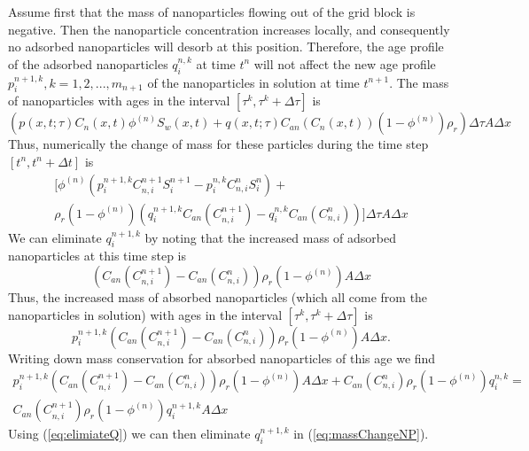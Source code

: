 \documentclass[nanomaterials,article,submit,moreauthors,pdftex]{Definitions/mdpi}
\begin{document}
Assume first that the mass of nanoparticles flowing out of the grid block is negative. Then the nanoparticle concentration increases locally, and consequently no adsorbed nanoparticles will desorb at this position. Therefore, the age profile of the adsorbed nanoparticles $q_i^{n,k}$ at time $t^n$ will not affect the new age profile  $p_i^{n+1,k},k=1,2,...,m_{n+1}$ of the nanoparticles in solution at time  $t^{n+1}$. The mass of nanoparticles with ages in the interval $\left[\tau^k, \tau^k+\Delta\tau\right]$ is
\begin{equation*}
    \left(p(x,t;\tau)C_n(x,t)\phi^{(n)}S_w(x,t) + q(x,t;\tau)C_{an}(C_n(x,t))(1-\phi^{(n)})\rho_r\right) \Delta\tau A\Delta x
\end{equation*}
Thus, numerically the change of mass for these particles during the time step $\left[t^n, t^n+\Delta t\right]$ is
\begin{multline} \label{eq:massChangeNP} %
    \bigg[\phi^{(n)}\left(p_i^{n+1,k}C_{n,i}^{n+1}S_i^{n+1}- p_{i}^{n,k}C_{n,i}^{n}S_{i}^{n}\right) +\\ \rho_r(1-\phi^{(n)}) \left(q_i^{n+1,k}C_{an}(C_{n,i}^{n+1})- q_{i}^{n,k}C_{an}(C_{n,i}^{n})\right)\bigg]
    \Delta\tau A\Delta x
\end{multline}
We can eliminate $q_{i}^{n+1,k}$ by noting that the increased mass of adsorbed nanoparticles at this time step is
\begin{equation*}
    \left(C_{an}(C_{n,i}^{n+1})- C_{an}(C_{n,i}^{n})\right)
    \rho_r\left(1-\phi^{(n)}\right) A\Delta x
\end{equation*}
Thus, the increased mass of absorbed nanoparticles (which all come from the nanoparticles in solution) with ages in the interval $\left[\tau^k, \tau^k+\Delta\tau\right]$ is
\begin{equation*}
    p_i^{n+1,k}\left(C_{an}(C_{n,i}^{n+1})- C_{an}(C_{n,i}^{n})\right)
    \rho_r\left(1-\phi^{(n)}\right) A\Delta x.
\end{equation*}
Writing down mass conservation for absorbed nanoparticles of this age we find
\begin{multline} \label{eq:elimiateQ} %
    p_i^{n+1,k}\left(C_{an}(C_{n,i}^{n+1})- C_{an}(C_{n,i}^{n})\right)
    \rho_r\left(1-\phi^{(n)}\right) A\Delta x +
    C_{an}(C_{n,i}^{n})\rho_r\left(1-\phi^{(n)}\right)q_i^{n,k} = \\
    C_{an}(C_{n,i}^{n+1})\rho_r\left(1-\phi^{(n)}\right)q_i^{n+1,k}A\Delta x 
\end{multline}
Using (\ref{eq:elimiateQ}) we can then eliminate $q_i^{n+1,k}$ in (\ref{eq:massChangeNP}). 
\end{document}
